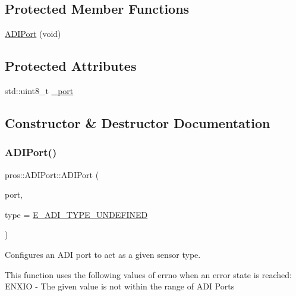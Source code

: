 \subsection*{Protected Member Functions}
\begin{DoxyCompactItemize}
\item 
\hyperlink{classpros_1_1ADIPort_a7f44b44ce0528ea4c5ef83ed8465e72d}{A\+D\+I\+Port} (void)
\end{DoxyCompactItemize}
\subsection*{Protected Attributes}
\begin{DoxyCompactItemize}
\item 
std\+::uint8\+\_\+t \hyperlink{classpros_1_1ADIPort_a75f3b6c1ae3c1f6b755e18444e7559d6}{\+\_\+port}
\end{DoxyCompactItemize}


\subsection{Constructor \& Destructor Documentation}
\mbox{\label{classpros_1_1ADIPort_ab6ef7710de366895859d770ffb1d8cf1}} 
\subsubsection{\texorpdfstring{A\+D\+I\+Port()}{ADIPort()}\hspace{0.1cm}{\footnotesize\ttfamily [1/2]}}
{\footnotesize\ttfamily pros\+::\+A\+D\+I\+Port\+::\+A\+D\+I\+Port (\begin{DoxyParamCaption}\item[{std\+::uint8\+\_\+t}]{port,  }\item[{\hyperlink{adi_8h_a4efff81399e823764aa05cd5c172ea55}{adi\+\_\+port\+\_\+config\+\_\+e\+\_\+t}}]{type = {\ttfamily \hyperlink{adi_8h_ad5f9ddf0fd9de73c4b23fa5485144b7fa37e9d6ebc03d88c58db1904a7f2b7373}{E\+\_\+\+A\+D\+I\+\_\+\+T\+Y\+P\+E\+\_\+\+U\+N\+D\+E\+F\+I\+N\+ED}} }\end{DoxyParamCaption})}



Configures an A\+DI port to act as a given sensor type. 

This function uses the following values of errno when an error state is reached\+: E\+N\+X\+IO -\/ The given value is not within the range of A\+DI Ports


